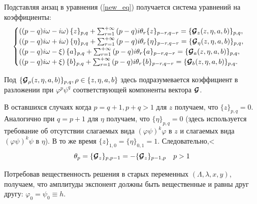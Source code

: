 Подставляя анзац в уравнения (\ref{new_eq}) получается система уравнений на коэффициенты:
\begin{equation}
\begin{cases}
\left((p-q)i\omega - i\omega \right)\{z\}_{p,q} + \sum_{r=1}^{+\infty}{(p-q)i\theta_r \{z\}_{p-r,q-r}} = \{\boldsymbol{\mathcal{G}}_z(z,\eta,a,b)\}_{p,q}, \\
\left((p-q)i\omega + i\omega \right)\{\eta\}_{p,q} + \sum_{r=1}^{+\infty}{(p-q)i\theta_r \{\eta\}_{p-r,q-r}} = \{\boldsymbol{\mathcal{G}}_\eta(z,\eta,a,b)\}_{p,q}, \\
\left((p-q)i\omega - \xi \right)\{a\}_{p,q} + \sum_{r=1}^{+\infty}{(p-q)i\theta_r \{a\}_{p-r,q-r}} = \{\boldsymbol{\mathcal{G}}_a(z,\eta,a,b)\}_{p,q}, \\
\left((p-q)i\omega + \xi \right)\{b\}_{p,q} + \sum_{r=1}^{+\infty}{(p-q)i\theta_r \{b\}_{p-r,q-r}} = \{\boldsymbol{\mathcal{G}}_b(z,\eta,a,b)\}_{p,q}. \\
\end{cases}
\label{pq_eq}
\end{equation}

Под $\{\boldsymbol{\mathcal{G}}_\rho(z,\eta,a,b)\}_{p,q}, \rho \in \{z,\eta,a,b\}$ здесь подразумевается коэффициент в разложении при $\varphi^p \psi^q$ соответствующей компоненты вектора $\boldsymbol{\mathcal{G}}$.

В оставшихся случаях когда $p=q+1, p+q>1$ для $z$ получаем, что $\{z\}_{p,q}=0$. Аналогично при $q=p+1$ для $\eta$ получаем, что $\{\eta\}_{p,q}=0$ (здесь используется требование об отсутствии слагаемых вида $(\varphi \psi)^k \varphi$ в $z$ и слагаемых вида $(\varphi \psi)^k \psi$ в $\eta$). В то же время $\{z\}_{1,0} = \{\eta\}_{0,1} = 1$. Следовательно,<
$$\theta_p = \{ \boldsymbol{\mathcal{G}}_z\}_{p,p-1} = - \{ \boldsymbol{\mathcal{G}}_z\}_{p-1,p} \quad p>1$$

Потребовав вещественность решения в старых переменных $(\Lambda,\lambda,x,y)$, получаем, что амплитуды экспонент должны быть вещественные и равны друг другу:
$\varphi_0 = \psi_0 \equiv h.$

